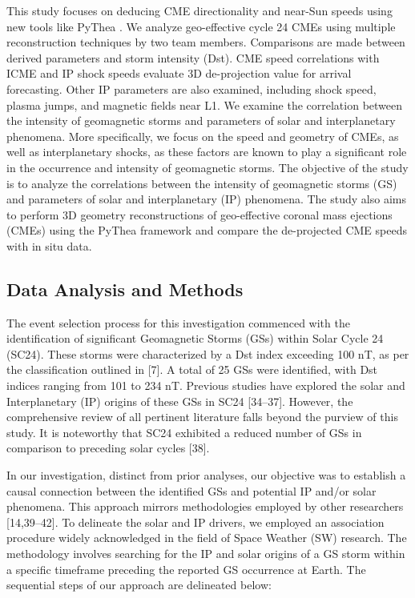 This study focuses on deducing CME directionality and near-Sun speeds using new tools like PyThea \citep{kouloumvakos_2022}. We analyze geo-effective cycle 24 CMEs using multiple reconstruction techniques by two team members. Comparisons are made between derived parameters and storm intensity (Dst). CME speed correlations with ICME and IP shock speeds evaluate 3D de-projection value for arrival forecasting. Other IP parameters are also examined, including shock speed, plasma jumps, and magnetic fields near L1. We examine the correlation between the intensity of geomagnetic storms and parameters of solar and interplanetary phenomena. More specifically, we focus on the speed and geometry of CMEs, as well as interplanetary shocks, as these factors are known to play a significant role in the occurrence and intensity of geomagnetic storms. The objective of the study is to analyze the correlations between the intensity of geomagnetic storms (GS) and parameters of solar and interplanetary (IP) phenomena. The study also aims to perform 3D geometry reconstructions of geo-effective coronal mass ejections (CMEs) using the PyThea framework and compare the de-projected CME speeds with in situ data.

\subsection{Data Analysis and Methods}
The event selection process for this investigation commenced with the identification of significant Geomagnetic Storms (GSs) within Solar Cycle 24 (SC24). These storms were characterized by a Dst index exceeding 100 nT, as per the classification outlined in [7]. A total of 25 GSs were identified, with Dst indices ranging from 101 to 234 nT. Previous studies have explored the solar and Interplanetary (IP) origins of these GSs in SC24 [34–37]. However, the comprehensive review of all pertinent literature falls beyond the purview of this study. It is noteworthy that SC24 exhibited a reduced number of GSs in comparison to preceding solar cycles [38].

In our investigation, distinct from prior analyses, our objective was to establish a causal connection between the identified GSs and potential IP and/or solar phenomena. This approach mirrors methodologies employed by other researchers [14,39–42]. To delineate the solar and IP drivers, we employed an association procedure widely acknowledged in the field of Space Weather (SW) research. The methodology involves searching for the IP and solar origins of a GS storm within a specific timeframe preceding the reported GS occurrence at Earth. The sequential steps of our approach are delineated below:

